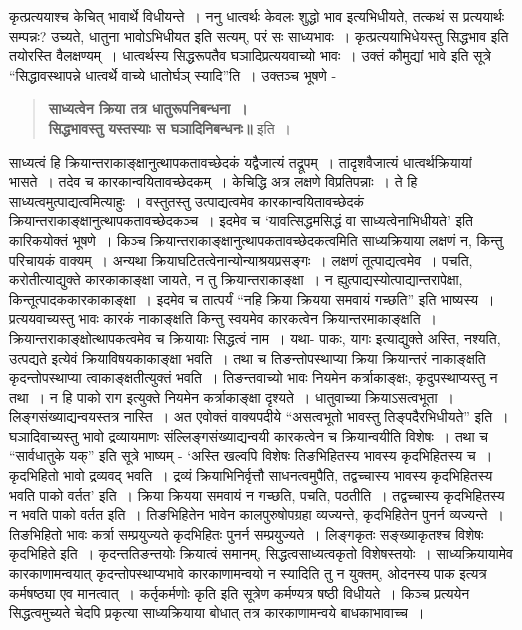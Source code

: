 {कृत्प्रत्ययाश्च केचित् भावार्थे विधीयन्ते~। ननु धात्वर्थः केवलः शुद्धो भाव इत्यभिधीयते, तत्कथं स प्रत्ययार्थः सम्पन्नः? उच्यते, धातुना भावोऽभिधीयत इति सत्यम्, परं सः साध्यभावः~। कृत्प्रत्ययाभिधेयस्तु सिद्धभाव इति तयोरस्ति वैलक्षण्यम्~। धात्वर्थस्य सिद्धरूपतैव घञादिप्रत्ययवाच्यो भावः~। उक्तं कौमुद्यां भावे इति सूत्रे “सिद्धावस्थापन्ने धात्वर्थे वाच्ये धातोर्घञ् स्यादि”ति~। उक्तञ्च भूषणे -
\begin{verse}
\textbf{साध्यत्वेन क्रिया तत्र धातुरूपनिबन्धना~। }\\
\textbf{सिद्धभावस्तु यस्तस्याः स घञादिनिबन्धनः॥} इति~। 
\end{verse}
साध्यत्वं हि क्रियान्तराकाङ्क्षानुत्थापकतावच्छेदकं यद्वैजात्यं तद्रूपम्~।     तादृशवैजात्यं धात्वर्थक्रियायां भासते~। तदेव च कारकान्वयितावच्छेदकम्~। केचिद्धि अत्र लक्षणे विप्रतिपन्नाः~। ते हि साध्यत्वमुत्पाद्यत्वमित्याहुः~। वस्तुतस्तु उत्पाद्यत्वमेव कारकान्वयितावच्छेदकं क्रियान्तराकाङ्क्षानुत्थापकतावच्छेदकञ्च~। इदमेव च ‘यावत्सिद्धमसिद्धं वा साध्यत्वेनाभिधीयते’ इति कारिकयोक्तं भूषणे~। किञ्च क्रियान्तराकाङ्क्षानुत्थापकतावच्छेदकत्वमिति साध्यक्रियाया लक्षणं न, किन्तु परिचायकं वाक्यम्~। अन्यथा क्रियाघटितत्वेनान्योन्याश्रयप्रसङ्गः~। लक्षणं तूत्पाद्यत्वमेव~। पचति, करोतीत्याद्युक्ते कारकाकाङ्क्षा जायते, न तु क्रियान्तराकाङ्क्षा~। न ह्युत्पाद्यस्योत्पाद्यान्तरापेक्षा, किन्तूत्पादककारकाकाङ्क्षा~। इदमेव च तात्पर्यं “नहि क्रिया क्रियया समवायं गच्छति” इति भाष्यस्य~। प्रत्ययवाच्यस्तु भावः कारकं नाकाङ्क्षति किन्तु स्वयमेव कारकत्वेन क्रियान्तरमाकाङ्क्षति~। क्रियान्तराकाङ्क्षोत्थापकत्वमेव च क्रियायाः सिद्धत्वं नाम~। यथा- पाकः, यागः इत्याद्युक्ते अस्ति, नश्यति, उत्पद्यते इत्येवं क्रियाविषयकाकाङ्क्षा भवति~। तथा च तिङन्तोपस्थाप्या क्रिया क्रियान्तरं नाकाङ्क्षति कृदन्तोपस्थाप्या त्वाकाङ्क्षतीत्युक्तं भवति~। तिङन्तवाच्यो भावः नियमेन कर्त्राकाङ्क्षः, कृदुपस्थाप्यस्तु न तथा~। न हि पाको राग इत्युक्ते नियमेन कर्त्राकाङ्क्षा दृश्यते~। धातुवाच्या क्रियाऽसत्वभूता~। लिङ्गसंख्याद्यन्वयस्तत्र नास्ति~। अत एवोक्तं वाक्यपदीये “असत्वभूतो भावस्तु तिङ्पदैरभिधीयते” इति~। घञादिवाच्यस्तु भावो द्रव्यायमाणः संल्लिङ्गसंख्याद्यन्वयी कारकत्वेन च क्रियान्वयीति विशेषः~। तथा च “सार्वधातुके यक्” इति सूत्रे भाष्यम् - ‘अस्ति खल्वपि विशेषः तिङभिहितस्य भावस्य कृदभिहितस्य च~। कृदभिहितो भावो द्रव्यवद् भवति~। द्रव्यं क्रियाभिनिर्वृत्तौ साधनत्वमुपैति, तद्वच्चास्य भावस्य कृदभिहितस्य भवति पाको वर्तत’ इति~। क्रिया क्रियया समवायं न गच्छति, पचति, पठतीति~। तद्वच्चास्य कृदभिहितस्य न भवति पाको वर्तत इति~। तिङभिहितेन भावेन कालपुरुषोपग्रहा व्यज्यन्ते, कृदभिहितेन पुनर्न व्यज्यन्ते~। तिङभिहितो भावः कर्त्रा सम्प्रयुज्यते कृदभिहितः पुनर्न सम्प्रयुज्यते~। लिङ्गकृतः सङ्ख्याकृतश्च विशेषः कृदभिहिते इति~। कृदन्ततिङन्तयोः क्रियात्वं समानम्, सिद्धत्वसाध्यत्वकृतो विशेषस्तयोः~। साध्यक्रियायामेव कारकाणामन्वयात् कृदन्तोपस्थाप्यभावे कारकाणामन्वयो न स्यादिति तु न युक्तम्, ओदनस्य पाक इत्यत्र कर्मषष्ठ्या एव मानत्वात्~। कर्तृकर्मणोः कृति इति सूत्रेण कर्मण्यत्र षष्ठी विधीयते~। किञ्च प्रत्ययेन सिद्धत्वमुच्यते चेदपि प्रकृत्या साध्यक्रियाया बोधात् तत्र कारकाणामन्वये बाधकाभावाच्च~। 

}

